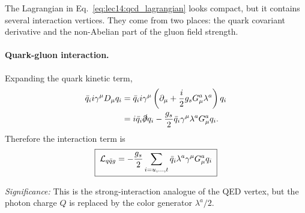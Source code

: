 \documentclass[../main.tex]{subfiles}
\begin{document}
The Lagrangian in Eq.~\eqref{eq:lec14:qcd_lagrangian} looks compact, but it contains several interaction vertices. They come from two places: the quark covariant derivative and the non-Abelian part of the gluon field strength.

\paragraph{Quark-gluon interaction.}
Expanding the quark kinetic term,
\begin{align}
  \bar q_i i\gamma^\mu D_\mu q_i
  &= \bar q_i i\gamma^\mu
     \left(\partial_\mu+\frac{i}{2}g_sG_\mu^a\lambda^a\right)q_i
     \notag\\
  &= i\bar q_i\slashed\partial q_i
     -\frac{g_s}{2}\bar q_i\gamma^\mu\lambda^aG_\mu^a q_i .
  \label{eq:lec14:expand_quark_kinetic}
\end{align}
Therefore the interaction term is
\begin{equation}
  \boxed{\;\mathcal{L}_{q\bar q g}
  =-\frac{g_s}{2}\sum_{i=u,\ldots,t}
  \bar q_i\lambda^a\gamma^\mu G_\mu^a q_i\;}
  \label{eq:lec14:quark_gluon_interaction}
\end{equation}

\textit{Significance:} This is the strong-interaction analogue of the QED vertex, but the photon charge $Q$ is replaced by the color generator $\lambda^a/2$.

\end{document}
